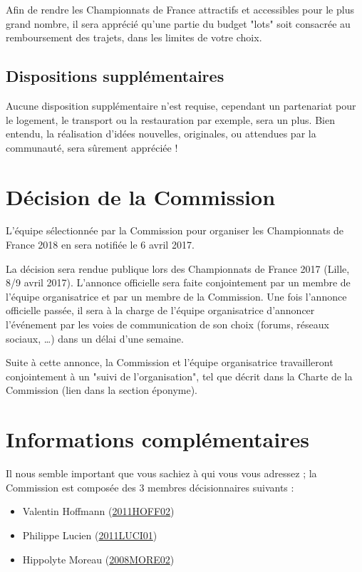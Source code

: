 \documentclass[a4paper,12pt]{scrartcl}
\begin{document}
Afin de rendre les Championnats de France attractifs et accessibles pour le plus grand nombre, il sera apprécié qu'une partie du budget "lots" soit consacrée au remboursement des trajets, dans les limites de votre choix.


\subsection*{Dispositions supplémentaires}

Aucune disposition supplémentaire n'est requise, cependant un partenariat pour le logement, le transport ou la restauration par exemple, sera un plus.
Bien entendu, la réalisation d'idées nouvelles, originales, ou attendues par la communauté, sera sûrement appréciée !


\section*{Décision de la Commission}

L'équipe sélectionnée par la Commission pour organiser les Championnats de France 2018 en sera notifiée le 6 avril 2017.

La décision sera rendue publique lors des Championnats de France 2017 (Lille, 8/9 avril 2017). L'annonce officielle sera faite conjointement par un membre de l'équipe organisatrice et par un membre de la Commission. Une fois l'annonce officielle passée, il sera à la charge de l'équipe organisatrice d'annoncer l'événement par les voies de communication de son choix (forums, réseaux sociaux, …) dans un délai d'une semaine.

Suite à cette annonce, la Commission et l'équipe organisatrice travailleront conjointement à un "suivi de l'organisation", tel que décrit dans la Charte de la Commission (lien dans la section éponyme).


\section*{Informations complémentaires}

Il nous semble important que vous sachiez à qui vous vous adressez ; la Commission est composée des 3 membres décisionnaires suivants :

\begin{itemize}
    \item Valentin Hoffmann (\href{https://www.worldcubeassociation.org/results/p.php?i=2011HOFF02}{2011HOFF02})
    \item Philippe Lucien (\href{https://www.worldcubeassociation.org/results/p.php?i=2011LUCI01}{2011LUCI01})
    \item Hippolyte Moreau (\href{https://www.worldcubeassociation.org/results/p.php?i=2008MORE02}{2008MORE02})
\end{itemize}
\end{document}
